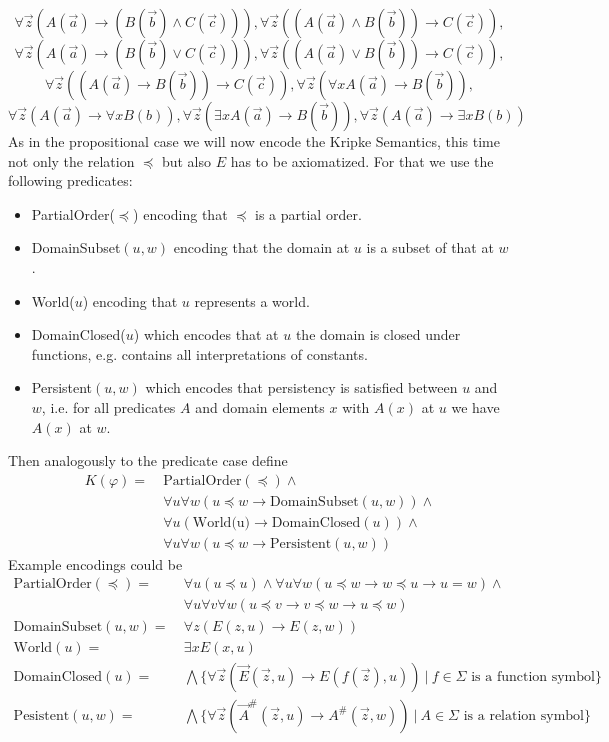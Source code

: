 \documentclass[a4paper,UKenglish,cleveref, autoref, thm-restate]{lipics-v2021}
\begin{document}
$$\forall \vec z(A(\vec a)\to (B(\vec b)\wedge C(\vec c))), \forall \vec z((A(\vec a)\wedge B(\vec b))\to C(\vec c)),$$$$ \forall \vec z(A(\vec a)\to (B(\vec b)\vee C(\vec c))),
\forall \vec z((A(\vec a)\vee B(\vec b))\to C(\vec c)),$$$$ \forall \vec z((A(\vec a)\to B(\vec b))\to C(\vec c)),\forall \vec z(\forall xA(\vec a)\to B(\vec b)),$$$$ \forall \vec z(A(\vec a)\to\forall xB(b)), \forall \vec z(\exists xA(\vec a)\to B(\vec b)), \forall \vec z(A(\vec a)\to\exists xB(b))$$	
As in the propositional case we will now encode the Kripke Semantics, this time not only the relation $\preceq$ but also $E$ has to be axiomatized. For that we use the following predicates:
\begin{itemize}
	\item PartialOrder($\preceq$) encoding that $\preceq$ is a partial order.
	\item DomainSubset$(u, w)$ encoding that the domain at $u$ is a subset of that at $w$.
	\item World($u$) encoding that $u$ represents a world.
	\item DomainClosed($u$) which encodes that at $u$ the domain is closed under functions, e.g. contains all interpretations of constants.
	\item Persistent$(u, w)$ which encodes that persistency is satisfied between $u$ and $w$, i.e. for all predicates $A$ and domain elements $x$ with $A(x)$ at $u$ we have $A(x)$ at $w$.
\end{itemize}
Then analogously to the predicate case define
\begin{align*}
	K(\varphi) = \:& \text{PartialOrder}(\preceq) \wedge \\
				 & \forall u \forall w (u\preceq w\to \text{DomainSubset}(u, w)) \wedge\\
				 & \forall u(\text{World(u)}\to \text{DomainClosed}(u))\wedge\\
				 & \forall u\forall w (u\preceq w\to \text{Persistent}(u, w))
\end{align*}
Example encodings could be
\begin{align*}
	\text{PartialOrder}(\preceq) = &\:\forall u(u\preceq u)\wedge\forall u\forall w(u\preceq w\to w\preceq u\to u = w)\wedge\\&\:\forall u\forall v\forall w(u\preceq v\to v\preceq w\to u\preceq w)\\
	\text{DomainSubset}(u, w) = &\:\forall z(E(z, u)\to E(z, w))\\
	\text{World}(u) = &\:\exists xE(x, u)\\
	\text{DomainClosed}(u) = &\:\bigwedge\{\forall\vec z(\vec E(\vec z, u)\to E(f(\vec z), u))\:|\:\text{$f\in\Sigma$ is a function symbol}\}\\
	\text{Pesistent}(u, w) = &\:\bigwedge\{\forall\vec z(\vec A^\#(\vec z, u)\to A^\#(\vec z, w))\:|\:\text{$A\in\Sigma$ is a relation symbol}\}
\end{align*}
\end{document}
